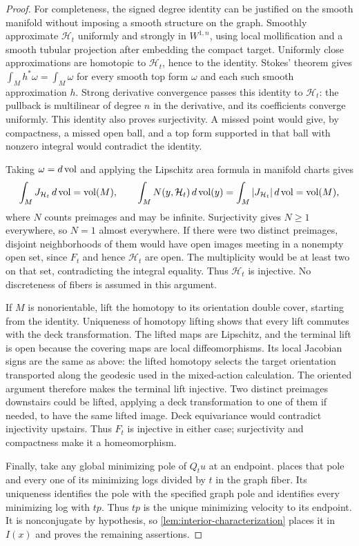 \begin{proof}
For completeness, the signed degree identity can be justified on
the smooth manifold without imposing a smooth structure on the
graph.  Smoothly approximate $\mathcal H_t$ uniformly and strongly
in $W^{1,n}$, using local mollification and a smooth tubular
projection after embedding the compact target.  Uniformly close
approximations are homotopic to $\mathcal H_t$, hence to the
identity.  Stokes' theorem gives
$\int_M h^*\omega=\int_M\omega$ for every smooth top form $\omega$
and each such smooth approximation $h$.  Strong derivative
convergence passes this identity to $\mathcal H_t$: the pullback
is multilinear of degree $n$ in the derivative, and its coefficients
converge uniformly.  This identity also proves surjectivity.  A
missed point would give, by compactness, a missed open ball, and a
top form supported in that ball with nonzero integral would
contradict the identity.

Taking $\omega=d\operatorname{vol}$ and applying the Lipschitz area formula
\cite[Chapter~2, Theorem~3.3, Remark~3.4, and (4.19)--(4.20)]{Simon2018} in manifold
charts gives
\[
 \int_M J_{\mathcal H_t}\,d\operatorname{vol}=\operatorname{vol}(M),
 \qquad
 \int_M N(y,\mathcal H_t)\,d\operatorname{vol}(y)
   =\int_M|J_{\mathcal H_t}|\,d\operatorname{vol}=\operatorname{vol}(M),
\]
where $N$ counts preimages and may be infinite.  Surjectivity gives
$N\geq1$ everywhere, so $N=1$ almost everywhere.  If there were
two distinct preimages, disjoint neighborhoods of them would have
open images meeting in a nonempty open set, since $F_t$ and hence
$\mathcal H_t$ are open.  The multiplicity would be at least two
on that set, contradicting the integral equality.  Thus
$\mathcal H_t$ is injective.  No discreteness of fibers is assumed
in this argument.

If $M$ is nonorientable, lift the homotopy to its orientation double
cover, starting from the identity.  Uniqueness of homotopy lifting
shows that every lift commutes with the deck transformation.
The lifted maps are Lipschitz, and the terminal lift is open because
the covering maps are local diffeomorphisms.  Its local Jacobian
signs are the same as above: the lifted homotopy selects the target
orientation transported along the geodesic used in the mixed-action
calculation.  The oriented argument therefore makes the terminal
lift injective.  Two distinct preimages downstairs could be lifted,
applying a deck transformation to one of them if needed, to have
the same lifted image.  Deck equivariance would contradict
injectivity upstairs.  Thus $F_t$ is injective in either case;
surjectivity and compactness make it a homeomorphism.

Finally, take any global minimizing pole of $Q_tu$ at an endpoint.
 places that pole and every
one of its minimizing logs divided by $t$ in the graph fiber.
Its uniqueness identifies the pole with the specified graph pole
and identifies every minimizing log with $tp$.  Thus $tp$ is the
unique minimizing velocity to its endpoint.  It is nonconjugate
by hypothesis, so \cref{lem:interior-characterization} places it in
$I(x)$ and proves the remaining assertions.
\end{proof}

